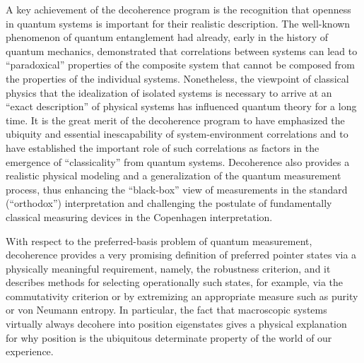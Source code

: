 \documentclass[rmp,aps,amsmath,amsfonts,noshowkeys,noshowpacs,12pt]{revtex4}
\begin{document}
A key achievement of the decoherence program is the recognition that
openness in quantum systems is important for their realistic
description. The well-known phenomenon of quantum entanglement had
already, early in the history of quantum mechanics, demonstrated that
correlations between systems can lead to ``paradoxical'' properties of
the composite system that cannot be composed from the properties of
the individual systems.  Nonetheless, the viewpoint of classical
physics that the idealization of isolated systems is necessary to
arrive at an ``exact description'' of physical systems has influenced
quantum theory for a long time.  It is the great merit of the
decoherence program to have emphasized the ubiquity and essential
inescapability of system-environment correlations and to have
established the important role of such correlations as factors in the
emergence of ``classicality'' from quantum systems. Decoherence also
provides a realistic physical modeling and a generalization of the
quantum measurement process, thus enhancing the ``black-box'' view of
measurements in the standard (``orthodox'') interpretation and
challenging the postulate of fundamentally classical measuring devices
in the Copenhagen interpretation.

With respect to the preferred-basis problem of quantum measurement,
decoherence provides a very promising definition of preferred pointer
states via a physically meaningful requirement, namely, the robustness
criterion, and it describes methods for selecting operationally such
states, for example, via the commutativity criterion or by extremizing
an appropriate measure such as purity or von Neumann entropy.  In
particular, the fact that macroscopic systems virtually always
decohere into position eigenstates gives a physical explanation for
why position is the ubiquitous determinate property of the world of
our experience.
\end{document}
